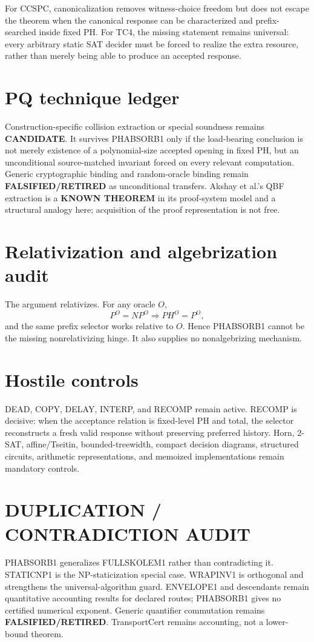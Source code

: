 \documentclass[11pt]{article}
\begin{document}
For CCSPC, canonicalization removes witness-choice freedom but does not escape the theorem when the canonical response can be characterized and prefix-searched inside fixed PH. For TC4, the missing statement remains universal: every arbitrary static SAT decider must be forced to realize the extra resource, rather than merely being able to produce an accepted response.

\section*{PQ technique ledger}
Construction-specific collision extraction or special soundness remains \textbf{CANDIDATE}. It survives PHABSORB1 only if the load-bearing conclusion is not merely existence of a polynomial-size accepted opening in fixed PH, but an unconditional source-matched invariant forced on every relevant computation. Generic cryptographic binding and random-oracle binding remain \textbf{FALSIFIED/RETIRED} as unconditional transfers. Akshay et al.'s QBF extraction is a \textbf{KNOWN THEOREM} in its proof-system model and a structural analogy here; acquisition of the proof representation is not free.

\section*{Relativization and algebrization audit}
The argument relativizes. For any oracle \(O\),
\[
P^O=NP^O\Longrightarrow PH^O=P^O,
\]
and the same prefix selector works relative to \(O\). Hence PHABSORB1 cannot be the missing nonrelativizing hinge. It also supplies no nonalgebrizing mechanism.

\section*{Hostile controls}
DEAD, COPY, DELAY, INTERP, and RECOMP remain active. RECOMP is decisive: when the acceptance relation is fixed-level PH and total, the selector reconstructs a fresh valid response without preserving preferred history. Horn, 2-SAT, affine/Tseitin, bounded-treewidth, compact decision diagrams, structured circuits, arithmetic representations, and memoized implementations remain mandatory controls.

\section*{DUPLICATION / CONTRADICTION AUDIT}
PHABSORB1 generalizes FULLSKOLEM1 rather than contradicting it. STATICNP1 is the NP-staticization special case. WRAPINV1 is orthogonal and strengthens the universal-algorithm guard. ENVELOPE1 and descendants remain quantitative accounting results for declared routes; PHABSORB1 gives no certified numerical exponent. Generic quantifier commutation remains \textbf{FALSIFIED/RETIRED}. TransportCert remains accounting, not a lower-bound theorem.
\end{document}
